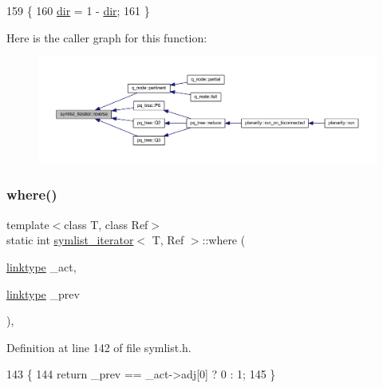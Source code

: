 \begin{DoxyCode}
159     \{
160     \mbox{\hyperlink{structsymlist__iterator_a8433e558ceb6b17b225414ef46b4a3e2}{dir}} = 1 - \mbox{\hyperlink{structsymlist__iterator_a8433e558ceb6b17b225414ef46b4a3e2}{dir}};
161     \}
\end{DoxyCode}
Here is the caller graph for this function\+:\nopagebreak
\begin{figure}[H]
\begin{center}
\leavevmode
\includegraphics[width=350pt]{structsymlist__iterator_a4135864290fda971467e41869b20e904_icgraph}
\end{center}
\end{figure}
\mbox{\label{structsymlist__iterator_a260b63ae284e3f07ae510105c7edd6a0}} 
\subsubsection{\texorpdfstring{where()}{where()}}
{\footnotesize\ttfamily template$<$class T, class Ref$>$ \\
static int \mbox{\hyperlink{structsymlist__iterator}{symlist\+\_\+iterator}}$<$ T, Ref $>$\+::where (\begin{DoxyParamCaption}\item[{\mbox{\hyperlink{structsymlist__iterator_ad9462ba519f8ca01ea64e04e25ee3750}{linktype}}}]{\+\_\+act,  }\item[{\mbox{\hyperlink{structsymlist__iterator_ad9462ba519f8ca01ea64e04e25ee3750}{linktype}}}]{\+\_\+prev }\end{DoxyParamCaption})\hspace{0.3cm}{\ttfamily [inline]}, {\ttfamily [static]}}



Definition at line 142 of file symlist.\+h.


\begin{DoxyCode}
143     \{
144     \textcolor{keywordflow}{return} \_prev == \_act->adj[0] ? 0 : 1;
145     \}
\end{DoxyCode}
\mbox{\label{structsymlist__iterator_abeee238d3bfff557cdbf08a05b632fa8}} 
